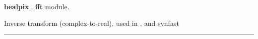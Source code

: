 \begin{modules}
  \begin{sulist}{} %
  \item[\textbf{healpix\_fft}] module.
  \end{sulist}
\end{modules}

\begin{related}
  \begin{sulist}{} %
  \item[\htmlref{ring\_synthesis}{sub:ring_synthesis}] Inverse transform (complex-to-real), used in
  ,
   and synfast
  \end{sulist}
\end{related}

\rule{\hsize}{2mm}

\newpage
